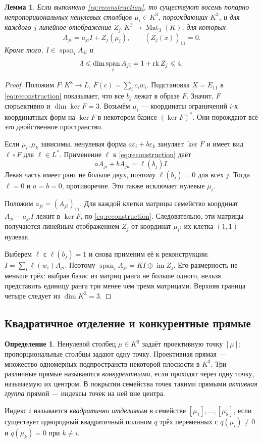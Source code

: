 \documentclass[11pt,a4paper]{article}
\numberwithin{equation}{section}
\theoremstyle{plain}
\newtheorem{lemma}[theorem]{Лемма}
\theoremstyle{definition}
\newtheorem{definition}[theorem]{Определение}
\DeclareMathOperator{\im}{im}\DeclareMathOperator{\supp}{supp}
\DeclareMathOperator{\Mat}{Mat}\DeclareMathOperator{\Span}{span}
\newcommand{\leqs}{\leqslant}\newcommand{\geqs}{\geqslant}
\begin{document}
\begin{lemma}\label{lem:kernel-model}
Если выполнено \eqref{eq:reconstruction}, то существуют восемь попарно
непропорциональных ненулевых столбцов $\mu_i\in K^3$, порождающих $K^3$,
и для каждого $j$ линейное отображение $Z_j:K^3\to\Mat_3(K)$, для которых
\[
 A_{ji}=a_{ji}I+Z_j(\mu_i),\qquad (Z_j(x))_{11}=0.
\]
Кроме того, $I\in\Span_i A_{ji}$ и
\[
 3\leqs\dim\Span_i A_{ji}=1+\rk Z_j\leqs4.
\]
\end{lemma}
\begin{proof}
Положим $F:K^8\to L$, $F(c)=\sum_i c_iw_i$. Подстановка $X=E_{11}$
в \eqref{eq:reconstruction} показывает, что все $b_j$ лежат в образе $F$.
Значит, $F$ сюръективно и $\dim\ker F=3$.
Возьмём $\mu_i$ --- координаты ограничений $i$-х координатных форм
на $\ker F$ в некотором базисе $(\ker F)^*$.
Они порождают всё это двойственное пространство.

Если $\mu_i,\mu_k$ зависимы, ненулевая форма
$a\varepsilon_i+b\varepsilon_k$ зануляет $\ker F$ и имеет вид
$\ell\circ F$ для $\ell\in L^*$. Применение $\ell$ к
\eqref{eq:reconstruction} даёт
\[
 aA_{ji}+bA_{jk}=\ell(b_j)I.
\]
Левая часть имеет ранг не больше двух, поэтому $\ell(b_j)=0$
для всех $j$. Тогда $\ell=0$ и $a=b=0$, противоречие.
Это также исключает нулевые $\mu_i$.

Положим $a_{ji}=(A_{ji})_{11}$. Для каждой клетки матрицы семейство
координат $A_{ji}-a_{ji}I$ лежит в $\ker F$, по
\eqref{eq:reconstruction}. Следовательно, эти матрицы получаются
линейным отображением $Z_j$ от координат $\mu_i$; их клетка $(1,1)$ нулевая.

Выберем $\ell$ с $\ell(b_j)=1$ и снова применим её к реконструкции:
$I=\sum_i\ell(w_i)A_{ji}$. Поэтому
$\Span_i A_{ji}=KI\oplus\im Z_j$.
Его размерность не меньше трёх: выбрав базис из матриц ранга не больше
одного, нельзя представить единицу ранга три менее чем тремя матрицами.
Верхняя граница четыре следует из $\dim K^3=3$.
\end{proof}

\subsection{Квадратичное отделение и конкурентные прямые}

\begin{definition}
Ненулевой столбец $\mu\in K^3$ задаёт проективную точку $[\mu]$;
пропорциональные столбцы задают одну точку. Проективная прямая ---
множество одномерных подпространств некоторой плоскости в $K^3$.
Три различные прямые называются \emph{конкурентными}, если проходят
через одну точку, называемую их центром.
В покрытии семейства точек такими прямыми \emph{активная группа}
прямой --- индексы точек на ней вне центра.

Индекс $i$ называется \emph{квадратично отделимым} в семействе
$[\mu_1],\ldots,[\mu_8]$, если существует однородный квадратичный
полином $q$ трёх переменных с $q(\mu_i)\ne0$ и $q(\mu_k)=0$ при $k\ne i$.
\end{definition}
\end{document}
